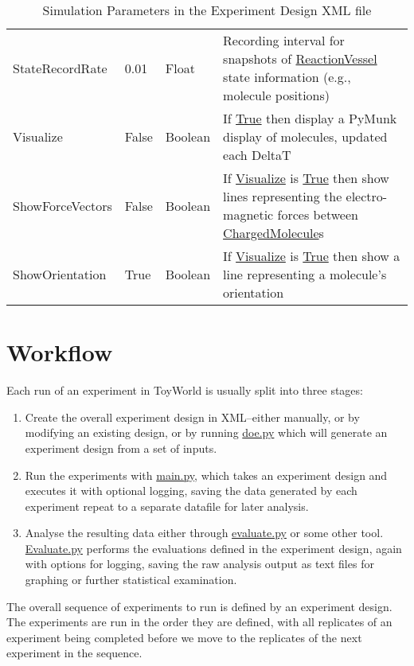 \begin{sidewaystable}
\begin{center}
\begin{tabular}{@{}lllp{10cm}@{}}
StateRecordRate&0.01&Float&Recording interval for snapshots of \url{ReactionVessel} state information (e.g., molecule positions)\\
Visualize&False&Boolean&If \url{True} then display a PyMunk display of molecules, updated each DeltaT\\
ShowForceVectors&False&Boolean&If \url{Visualize} is \url{True} then show lines representing the electro-magnetic forces between \url{ChargedMolecule}s\\
ShowOrientation&True&Boolean&If \url{Visualize} is \url{True} then show a line representing a molecule's orientation\\
\bottomrule
\end{tabular}
\end{center}
\caption{Simulation Parameters in the Experiment Design XML file}
\label{tbl:simulation_parameters}
\end{sidewaystable}

\section{Workflow}\label{workflow}

Each run of an experiment in ToyWorld is usually split into three
stages:

\begin{enumerate}
\item
  Create the overall experiment design in XML--either manually, or by
  modifying an existing design, or by running \url{doe.py} which will
  generate an experiment design from a set of inputs.
\item
  Run the experiments with \url{main.py}, which takes an experiment
  design and executes it with optional logging, saving the data
  generated by each experiment repeat to a separate datafile for later
  analysis.
\item
  Analyse the resulting data either through \url{evaluate.py} or some
  other tool. \url{Evaluate.py} performs the evaluations defined in the
  experiment design, again with options for logging, saving the raw
  analysis output as text files for graphing or further statistical
  examination.
\end{enumerate}

The overall sequence of experiments to run is defined by an experiment
design. The experiments are run in the order they are defined, with all
replicates of an experiment being completed before we move to the
replicates of the next experiment in the sequence.

